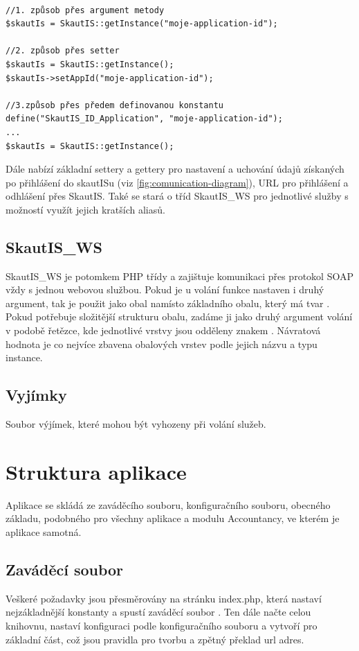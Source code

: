 \documentclass[thesis=B,czech]{FITthesis}[2011/06/14]
\begin{document}
\begin{verbatim}

//1. způsob přes argument metody
$skautIs = SkautIS::getInstance("moje-application-id");

//2. způsob přes setter
$skautIs = SkautIS::getInstance();
$skautIs->setAppId("moje-application-id"); 

//3.způsob přes předem definovanou konstantu
define("SkautIS_ID_Application", "moje-application-id"); 
...
$skautIs = SkautIS::getInstance(); 
\end{verbatim}

Dále nabízí základní settery a gettery pro nastavení a uchování údajů získaných po přihlášení do skautISu (viz \ref{fig:comunication-diagram}), URL pro přihlášení a odhlášení přes SkautIS. Také se stará o  tříd SkautIS\_WS pro jednotlivé služby s možností využít jejich kratších aliasů. 

\subsection{SkautIS\_WS}
SkautIS\_WS je potomkem PHP třídy  a zajištuje komunikaci přes protokol SOAP vždy s jednou webovou službou. Pokud je u volání funkce nastaven i druhý argument, tak je použit jako obal namísto základního obalu, který má tvar . Pokud potřebuje složitější strukturu obalu, zadáme ji jako druhý argument volání v podobě řetězce, kde jednotlivé vrstvy jsou odděleny znakem \uv{/}. Návratová hodnota je co nejvíce zbavena obalových vrstev podle jejich názvu a typu instance.

\subsection{Vyjímky}
Soubor výjímek, které mohou být vyhozeny při volání služeb.

\section{Struktura aplikace}
Aplikace se skládá ze zaváděcího souboru, konfiguračního souboru, obecného základu, podobného pro všechny aplikace a modulu Accountancy, ve kterém je aplikace samotná.

\subsection{Zaváděcí soubor}
Veškeré požadavky jsou přesměrovány na stránku index.php, která nastaví nejzákladnější konstanty a spustí zaváděcí soubor . Ten dále načte celou knihovnu, nastaví konfiguraci podle konfiguračního souboru a vytvoří  pro základní část, což jsou pravidla pro tvorbu a zpětný překlad url adres. 
\end{document}

